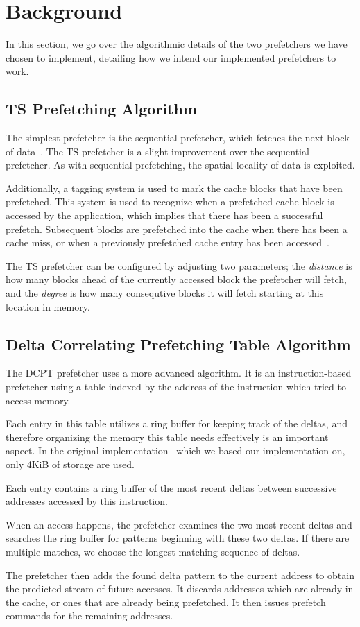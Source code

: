 \section{Background}

In this section, we go over the algorithmic details of the two prefetchers we
have chosen to implement, detailing how we intend our implemented prefetchers
to work.

\subsection{TS Prefetching Algorithm}

The simplest prefetcher is the sequential prefetcher, which fetches the next
block of data~\cite{seq}. The TS prefetcher is a slight improvement over the
sequential prefetcher. As with sequential prefetching, the spatial locality of
data is exploited.

Additionally, a tagging system is used to mark the cache blocks that have been
prefetched. This system is used to recognize when a prefetched cache block is
accessed by the application, which implies that there has been a successful
prefetch. Subsequent blocks are prefetched into the cache when there has been a
cache miss, or when a previously prefetched cache entry has been
accessed~\cite{grannaes}.

The TS prefetcher can be configured by adjusting two parameters; the
\emph{distance} is how many blocks ahead of the currently accessed block the
prefetcher will fetch, and the \emph{degree} is how many consequtive blocks it
will fetch starting at this location in memory.

\subsection{Delta Correlating Prefetching Table Algorithm}

The DCPT prefetcher uses a more advanced algorithm. It is an instruction-based
prefetcher using a table indexed by the address of the instruction which tried
to access memory.

Each entry in this table utilizes a ring buffer for keeping track of the deltas,
and therefore organizing the memory this table needs effectively is an important
aspect. In the original implementation~\cite{dcpt} which we based our
implementation on, only 4KiB of storage are used.

Each entry contains a ring buffer of the most recent deltas between successive
addresses accessed by this instruction.

When an access happens, the prefetcher examines the two most recent deltas and
searches the ring buffer for patterns beginning with these two deltas. If there
are multiple matches, we choose the longest matching sequence of deltas.

The prefetcher then adds the found delta pattern to the current address to
obtain the predicted stream of future accesses. It discards addresses which
are already in the cache, or ones that are already being prefetched. It then
issues prefetch commands for the remaining addresses.
